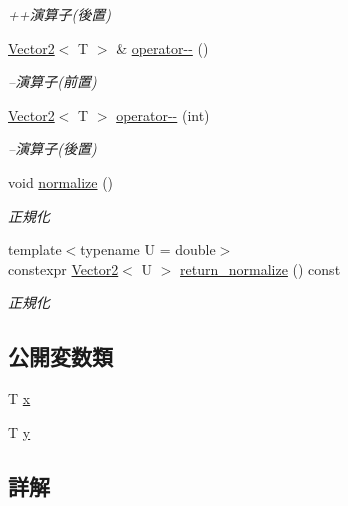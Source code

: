 \begin{DoxyCompactItemize}
\begin{DoxyCompactList}\small\item\em ++演算子(後置) \end{DoxyCompactList}\item 
\mbox{\hyperlink{classsaki_1_1_vector2}{Vector2}}$<$ T $>$ \& \mbox{\hyperlink{classsaki_1_1_vector2_a18a60739e3bf2673b1b2c28b523b6383}{operator-\/-\/}} ()
\begin{DoxyCompactList}\small\item\em --演算子(前置) \end{DoxyCompactList}\item 
\mbox{\hyperlink{classsaki_1_1_vector2}{Vector2}}$<$ T $>$ \mbox{\hyperlink{classsaki_1_1_vector2_adf7dcca2ef5c70fdf172a005b3474702}{operator-\/-\/}} (int)
\begin{DoxyCompactList}\small\item\em --演算子(後置) \end{DoxyCompactList}\item 
void \mbox{\hyperlink{classsaki_1_1_vector2_a8267f8608ffad9796813856c05076d8c}{normalize}} ()
\begin{DoxyCompactList}\small\item\em 正規化 \end{DoxyCompactList}\item 
{\footnotesize template$<$typename U  = double$>$ }\\constexpr \mbox{\hyperlink{classsaki_1_1_vector2}{Vector2}}$<$ U $>$ \mbox{\hyperlink{classsaki_1_1_vector2_ad4fe2f7cb118bfad82333017c15c591a}{return\+\_\+normalize}} () const
\begin{DoxyCompactList}\small\item\em 正規化 \end{DoxyCompactList}\end{DoxyCompactItemize}
\subsection*{公開変数類}
\begin{DoxyCompactItemize}
\item 
T \mbox{\hyperlink{classsaki_1_1_vector2_a69df7df6da198f35ef8ed269eb095c27}{x}}
\item 
T \mbox{\hyperlink{classsaki_1_1_vector2_a54e83290254fb653eff9b8dcf6a10878}{y}}
\end{DoxyCompactItemize}


\subsection{詳解}
